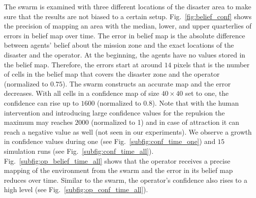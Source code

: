 \documentclass[runningheads]{llncs}%
\begin{document}
The swarm is examined with three different locations of the disaster area to make sure that the results are not biased to a certain setup. Fig.~\ref{fig:belief_conf} shows the precision of mapping an area with the median, lower, and upper quarterlies of errors in belief map over time. The error in belief map is the absolute difference between agents' belief about the mission zone and the exact locations of the disaster and the operator. At the beginning, the agents have no values stored in the belief map. Therefore, the errors start at around $14$ pixels that is the number of cells in the belief map that covers the disaster zone and the operator (normalized to $0.75$). The swarm constructs an accurate map and the error decreases. With all cells in a confidence map of size $40 \times 40$ set to one, the confidence can rise up to $1600$ (normalized to $0.8$). Note that with the human intervention and introducing large confidence values for the repulsion the maximum may reaches $2000$ (normalized to 1) and in case of attraction it can reach a negative value as well (not seen in our experiments). We observe a growth in confidence values during one (see Fig.~\ref{subfig:conf_time_one}) and {$15$} simulation runs (see Fig.~\ref{subfig:conf_time_all}). Fig.~\ref{subfig:op_belief_time_all} shows that the operator receives a precise mapping of the environment from the swarm and the error in its belief map reduces over time.  Similar to the swarm, the operator's confidence also rises to a high level (see Fig.~\ref{subfig:op_conf_time_all}).
\end{document}
